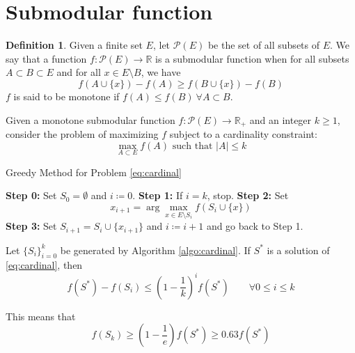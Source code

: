 \documentclass[12pt, openany]{report}
\newcommand{\R}{\mathbb{R}}
\theoremstyle{definition}
\newtheorem{definition}[thm]{Definition}
\begin{document}
\section{Submodular function}
\begin{definition}
    Given a finite set $E$, let $\mathcal{P}(E)$ be the set of all subsets of $E$. We say that a function $f:\mathcal{P}(E)\rightarrow \R$ is a submodular function when for all subsets $A\subset B\subset E$ and for all $x\in E\setminus B$, we have 
    \begin{equation}
        f(A\cup \{x\})-f(A) \ge f(B\cup \{x\})-f(B)
    \end{equation}
    $f$ is said to be monotone if $f(A)\le f(B)\: \forall A\subset B$.
\end{definition}
Given a monotone submodular function $f:\mathcal{P}(E)\rightarrow \R_+$ and an integer $k\ge 1$, consider the problem of maximizing $f$ subject to a cardinality constraint:
\begin{equation}\label{eq:cardinal}
    \max_{A\subset E} f(A) \text{ such that } |A| \le k
\end{equation}
\begin{algorithm}
    \caption{Greedy Method for Problem \eqref{eq:cardinal}}\label{algo:cardinal}
    \begin{algorithmic}[1]
    \State \textbf{Step 0:} Set $S_0=\emptyset$ and $i\coloneqq 0$.
    \State \textbf{Step 1:} If $i=k$, stop.
    \State \textbf{Step 2:} Set 
    \begin{equation}
        x_{i+1} = \arg\max_{x\in E\setminus S_i} f(S_i\cup \{x\})
    \end{equation}
    \State \textbf{Step 3:} Set $S_{i+1}=S_i\cup \{x_{i+1}\}$ and $i\coloneqq i+1$ and go back to Step 1.
    \end{algorithmic}
\end{algorithm}
\begin{tcolorbox}[breakable,
    colback=white,
    colframe=white!75!black,
    title={Theorem}]
Let $\{S_i\}_{i=0}^k$ be generated by Algorithm \ref{algo:cardinal}. If $S^*$ is a solution of \eqref{eq:cardinal}, then 
\begin{equation}
    f(S^*) -f(S_i) \le \left(1-\frac{1}{k}\right)^i f(S^*) \qquad \forall 0\le i \le k
\end{equation}
\end{tcolorbox}
This means that 
\begin{equation}
    f(S_k) \ge \left(1-\frac{1}{e}\right)f(S^*)\ge 0.63 f(S^*)
\end{equation}
\end{document}
